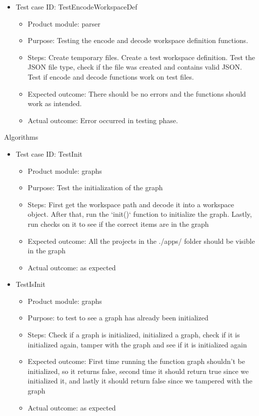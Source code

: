\documentclass[11pt]{article}
\begin{document}
\begin{itemize}
    \item Test case ID: TestEncodeWorkspaceDef
    \begin{itemize}
        \item Product module: parser
        \item Purpose: Testing the encode and decode workspace definition functions.
        \item Steps: Create temporary files. Create a test workspace definition. Test the JSON file type, check if the file was created and contains valid JSON. Test if encode and decode functions work on test files.
        \item Expected outcome: There should be no errors and the functions should work as intended.
        \item Actual outcome: Error occurred in testing phase.
    \end{itemize}
\end{itemize}

Algorithms
\begin{itemize}
    \item Test case ID: TestInit
    \begin{itemize}
        \item Product module: graphs
        \item Purpose: Test the initialization of the graph
        \item Steps: First get the workspace path and decode it into a workspace object. After that, run the `init()` function to initialize the graph. Lastly, run checks on it to see if the correct items are in the graph
        \item Expected outcome: All the projects in the ./apps/ folder should be visible in the graph
        \item Actual outcome: as expected
    \end{itemize}
\end{itemize}

\begin{itemize}
    \item TestIsInit
    \begin{itemize}
        \item Product module: graphs
        \item Purpose: to test to see a graph has already been initialized
        \item Steps: Check if a graph is initialized, initialized a graph, check if it is initialized again, tamper with the graph and see if it is initialized again
        \item Expected outcome: First time running the function graph shouldn't be initialized, so it returns false, second time it should return true since we initialized it, and lastly it should return false since we tampered with the graph
        \item Actual outcome: as expected
    \end{itemize}
\end{itemize}
\end{document}

